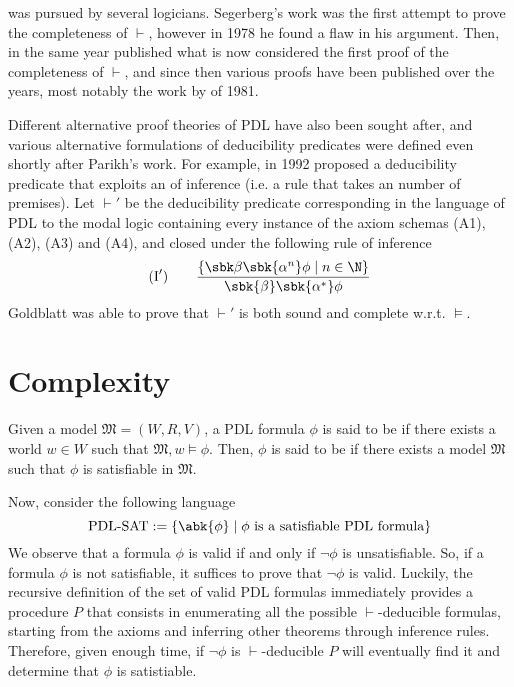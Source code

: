 \documentclass[a4paper, 12pt]{report}
\begin{document}
     was pursued by several logicians. Segerberg's work was the first attempt to prove the completeness of $\vdash$, however in 1978 he found a flaw in his argument. Then, in the same year \textcite{parikh} published what is now considered the first proof of the completeness of $\vdash$, and since then various proofs have been published over the years, most notably the work by \textcite{kozen} of 1981. 
    
    Different alternative proof theories of PDL have also been sought after, and various alternative formulations of deducibility predicates were defined even shortly after Parikh's work. For example, in 1992 \textcite{goldblatt} proposed a deducibility predicate that exploits an  of inference (i.e. a rule that takes an  number of premises). Let $\vdash'$ be the deducibility predicate corresponding in the language of PDL to the  modal logic containing every instance of the axiom schemas (A1), (A2), (A3) and (A4), and closed under the following  rule of inference $$(\mbox I') \quad \quad \dfrac{\{\sbk \beta \sbk{\alpha^n} \phi \mid n \in \N\}}{\sbk{\beta} \sbk{\alpha^*} \phi}$$ Goldblatt was able to prove that $\vdash'$ is both sound and complete w.r.t. $\models$.

    \section{Complexity}

    Given a model $\mathfrak M = (W, R, V)$, a PDL formula $\phi$ is said to be  if there exists a world $w \in W$ such that $\mathfrak M, w \models \phi$. Then, $\phi$ is said to be  if there exists a model $\mathfrak M$ such that $\phi$ is satisfiable in $\mathfrak M$.
    
    Now, consider the following language $$\mbox{PDL-SAT} := \{\abk{\phi} \mid \phi \ \mbox{is a satisfiable PDL formula}\}$$ We observe that a formula $\phi$ is valid if and only if $\lnot \phi$ is unsatisfiable. So, if a formula $\phi$ is not satisfiable, it suffices to prove that $\lnot \phi$ is valid. Luckily, the recursive definition of the set of valid PDL formulas immediately provides a procedure $P$ that consists in enumerating all the possible $\vdash$-deducible formulas, starting from the axioms and inferring other theorems through inference rules. Therefore, given enough time, if $\lnot \phi$ is $\vdash$-deducible $P$ will eventually find it and determine that $\phi$ is  satistiable.
\end{document}
